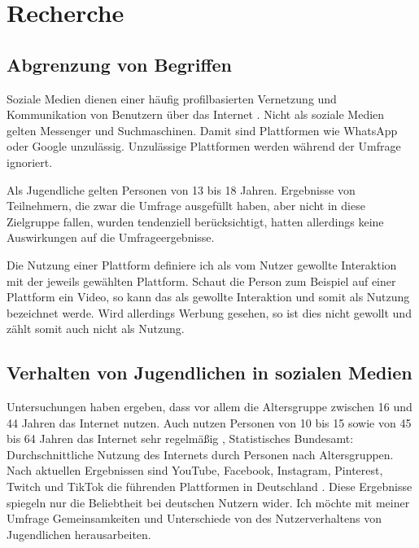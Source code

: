 \section{Recherche}

\subsection{Abgrenzung von Begriffen}

Soziale Medien dienen einer häufig profilbasierten Vernetzung und Kommunikation von Benutzern über das Internet  \footnotemark
{}. Nicht als soziale Medien gelten Messenger und Suchmaschinen. Damit 
sind Plattformen wie WhatsApp oder Google unzulässig. Unzulässige Plattformen werden während der Umfrage ignoriert.

Als Jugendliche gelten Personen von 13 bis 18 Jahren. Ergebnisse von Teilnehmern, die zwar die Umfrage ausgefüllt haben, aber nicht
in diese Zielgruppe fallen, wurden tendenziell berücksichtigt, hatten allerdings keine Auswirkungen auf die Umfrageergebnisse.

Die Nutzung einer Plattform definiere ich als vom Nutzer gewollte Interaktion mit der jeweils gewählten Plattform. Schaut die Person zum Beispiel auf einer 
Plattform ein Video, so kann das als gewollte Interaktion und somit als Nutzung bezeichnet werde. Wird allerdings Werbung gesehen,
so ist dies nicht gewollt und zählt somit auch nicht als Nutzung.

\subsection{Verhalten von Jugendlichen in sozialen Medien}

Untersuchungen haben ergeben, dass vor allem die Altersgruppe zwischen 16 und 44 Jahren das Internet
nutzen. Auch nutzen Personen von 10 bis 15 sowie von 45 bis 64 Jahren das Internet sehr regelmäßig \footnotemark\footnotetext
{\Cite{11.August.2020}, Statistisches Bundesamt: Durchschnittliche Nutzung des Internets durch Personen nach Altersgruppen}.
Nach aktuellen Ergebnissen sind YouTube, Facebook, Instagram, Pinterest, Twitch und TikTok die führenden Plattformen in Deutschland
\footnotemark{}. Diese Ergebnisse spiegeln nur die Beliebtheit bei deutschen 
Nutzern wider. Ich möchte mit meiner Umfrage  Gemeinsamkeiten und Unterschiede von des Nutzerverhaltens von Jugendlichen 
herausarbeiten. 

